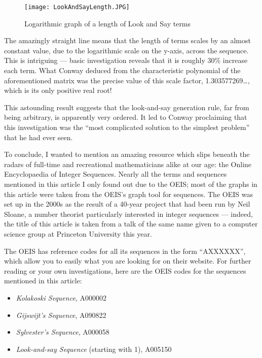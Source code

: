 \documentclass[11pt,a4paper]{report}
\begin{document}
	\begin{figure}
		\caption{Logarithmic graph of a length of Look and Say terms}
		\centering
		\texttt{[image: LookAndSayLength.JPG]}
	\end{figure}
	
	\begin{multicols}{2}
		
		The amazingly straight line means that the length of terms scales by an almost constant value, due to the logarithmic scale on the y-axis, across the sequence. This is intriguing --- basic investigation reveals that it is roughly 30\% increase each term. What Conway deduced from the characteristic polynomial of the aforementioned matrix was the precise value of this scale factor, 1.303577269\ldots, which is its only positive real root!\par
		This astounding result suggests that the look-and-say generation rule, far from being arbitrary, is apparently very ordered. It led to Conway proclaiming that this investigation was the “most complicated solution to the simplest problem” that he had ever seen.\par
		To conclude, I wanted to mention an amazing resource which slips beneath the radars of full-time and recreational mathematicians alike at our age: the Online Encyclopaedia of Integer Sequences. Nearly all the terms and sequences mentioned in this article I only found out due to the OEIS; most of the graphs in this article were taken from the OEIS’s graph tool for sequences. The OEIS was set up in the 2000s as the result of a 40-year project that had been run by Neil Sloane, a number theorist particularly interested in integer sequences --- indeed, the title of this article is taken from a talk of the same name given to a computer science group at Princeton University this year.\par
		The OEIS has reference codes for all its sequences in the form “AXXXXXX”, which allow you to easily what you are looking for on their website. For further reading or your own investigations, here are the OEIS codes for the sequences mentioned in this article:
		
		\begin{itemize}
			\item{\textit{Kolakoski Sequence}, A000002}
			\item{\textit{Gijswijt’s Sequence}, A090822}
			\item{\textit{Sylvester’s Sequence}, A000058}
			\item{\textit{Look-and-say Sequence} (starting with 1), A005150}
		\end{itemize}
		

\end{multicols}
\end{document}
